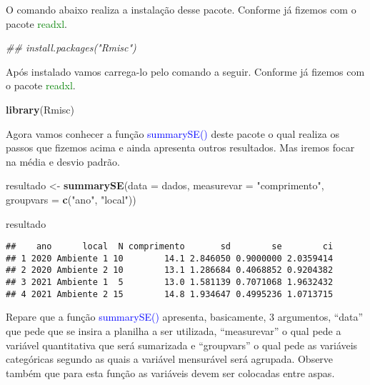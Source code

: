 \documentclass[titlepage, oneside, openany, a4paper]{book}
\newenvironment{Shaded}{\begin{snugshade}}{\end{snugshade}}
\newcommand{\CommentTok}[1]{\textcolor[rgb]{0.56,0.35,0.01}{\textit{#1}}}
\newcommand{\DataTypeTok}[1]{\textcolor[rgb]{0.13,0.29,0.53}{#1}}
\newcommand{\KeywordTok}[1]{\textcolor[rgb]{0.13,0.29,0.53}{\textbf{#1}}}
\newcommand{\NormalTok}[1]{#1}
\newcommand{\StringTok}[1]{\textcolor[rgb]{0.31,0.60,0.02}{#1}}
\begin{document}
O comando abaixo realiza a instalação desse pacote. Conforme já fizemos com o pacote \textcolor{green}{readxl}.

\begin{Shaded}
\begin{Highlighting}[]
\CommentTok{## install.packages("Rmisc")}
\end{Highlighting}
\end{Shaded}

Após instalado vamos carrega-lo pelo comando a seguir. Conforme já fizemos com o pacote \textcolor{green}{readxl}.

\begin{Shaded}
\begin{Highlighting}[]
\KeywordTok{library}\NormalTok{(Rmisc)}
\end{Highlighting}
\end{Shaded}

Agora vamos conhecer a função \textcolor{blue}{summarySE()} deste pacote o qual realiza os passos que fizemos acima e ainda apresenta outros resultados. Mas iremos focar na média e desvio padrão.

\begin{Shaded}
\begin{Highlighting}[]
\NormalTok{resultado <-}\StringTok{ }\KeywordTok{summarySE}\NormalTok{(}\DataTypeTok{data =}\NormalTok{ dados, }
                       \DataTypeTok{measurevar =} \StringTok{"comprimento"}\NormalTok{, }
                       \DataTypeTok{groupvars =} \KeywordTok{c}\NormalTok{(}\StringTok{"ano"}\NormalTok{, }\StringTok{"local"}\NormalTok{))}

\NormalTok{resultado}
\end{Highlighting}
\end{Shaded}

\begin{verbatim}
##    ano      local  N comprimento       sd        se        ci
## 1 2020 Ambiente 1 10        14.1 2.846050 0.9000000 2.0359414
## 2 2020 Ambiente 2 10        13.1 1.286684 0.4068852 0.9204382
## 3 2021 Ambiente 1  5        13.0 1.581139 0.7071068 1.9632432
## 4 2021 Ambiente 2 15        14.8 1.934647 0.4995236 1.0713715
\end{verbatim}

Repare que a função \textcolor{blue}{summarySE()} apresenta, basicamente, 3 argumentos, ``data'' que pede que se insira a planilha a ser utilizada, ``measurevar'' o qual pede a variável quantitativa que será sumarizada e ``groupvars'' o qual pede as variáveis categóricas segundo as quais a variável mensurável será agrupada. Observe também que para esta função as variáveis devem ser colocadas entre aspas.
\end{document}
